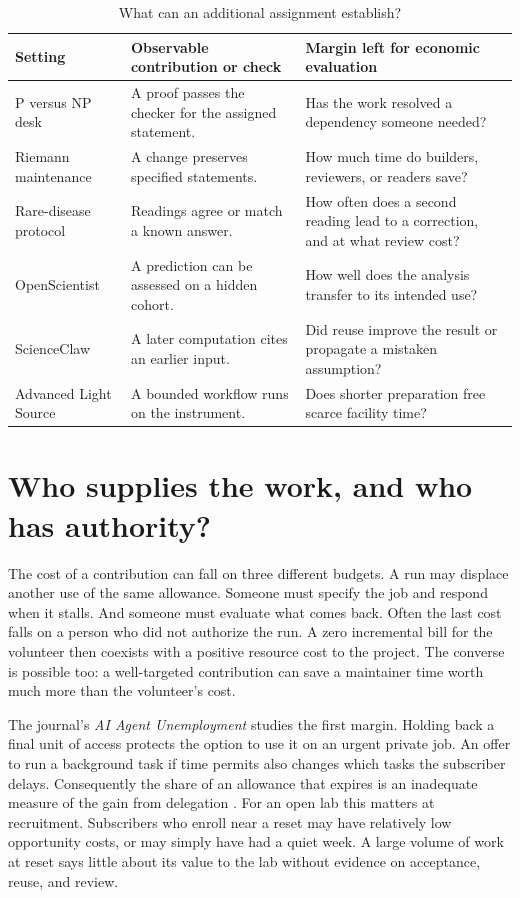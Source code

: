 \documentclass[11pt,letterpaper]{article}
\begin{document}
\begin{table}[htbp]
\caption{What can an additional assignment establish?}\label{tab:cases}
\centering\small
\renewcommand{\arraystretch}{1.18}
\begin{tabularx}{\linewidth}{@{}p{.19\linewidth}YY@{}}
\toprule
Setting & Observable contribution or check & Margin left for economic evaluation\\
\midrule
P versus NP desk & A proof passes the checker for the assigned statement. & Has the work resolved a dependency someone needed?\\
Riemann maintenance & A change preserves specified statements. & How much time do builders, reviewers, or readers save?\\
Rare-disease protocol & Readings agree or match a known answer. & How often does a second reading lead to a correction, and at what review cost?\\
OpenScientist & A prediction can be assessed on a hidden cohort. & How well does the analysis transfer to its intended use?\\
ScienceClaw & A later computation cites an earlier input. & Did reuse improve the result or propagate a mistaken assumption?\\
Advanced Light Source & A bounded workflow runs on the instrument. & Does shorter preparation free scarce facility time?\\
\bottomrule
\end{tabularx}
\end{table}

\section{Who supplies the work, and who has authority?}

The cost of a contribution can fall on three different budgets. A run may displace another use of the same allowance. Someone must specify the job and respond when it stalls. And someone must evaluate what comes back. Often the last cost falls on a person who did not authorize the run. A zero incremental bill for the volunteer then coexists with a positive resource cost to the project. The converse is possible too: a well-targeted contribution can save a maintainer time worth much more than the volunteer's cost.

The journal's \emph{AI Agent Unemployment} studies the first margin. Holding back a final unit of access protects the option to use it on an urgent private job. An offer to run a background task if time permits also changes which tasks the subscriber delays. Consequently the share of an allowance that expires is an inadequate measure of the gain from delegation \citep{unemployment}. For an open lab this matters at recruitment. Subscribers who enroll near a reset may have relatively low opportunity costs, or may simply have had a quiet week. A large volume of work at reset says little about its value to the lab without evidence on acceptance, reuse, and review.
\end{document}
